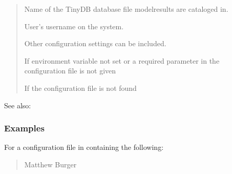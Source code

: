 \documentclass[letterpaper,10pt,english]{sphinxmanual}
\begin{document}
\begin{fulllineitems}
\begin{quote}
\begin{description}
\begin{description}
\sphinxAtStartPar
Name of the TinyDB database file modelresults are cataloged in.

\sphinxAtStartPar
User’s username on the system.

\sphinxAtStartPar
Other configuration settings can be included.

\end{description}

\begin{description}
\sphinxAtStartPar
If  environment variable not set or a required
parameter in the configuration file is not given

\sphinxAtStartPar
If the configuration file is not found

\end{description}

\end{description}\end{quote}


\begin{sphinxseealso}{See also:}
\begin{description}
\end{description}


\end{sphinxseealso}

\subsubsection*{Examples}

\sphinxAtStartPar
For a configuration file in  containing the following:

\begin{sphinxVerbatim}[commandchars=\\\{\}]
  
  
  
\end{sphinxVerbatim}
\begin{quote}\begin{description}
\sphinxAtStartPar
Matthew Burger


\end{description}
\end{quote}
\end{fulllineitems}
\end{document}
